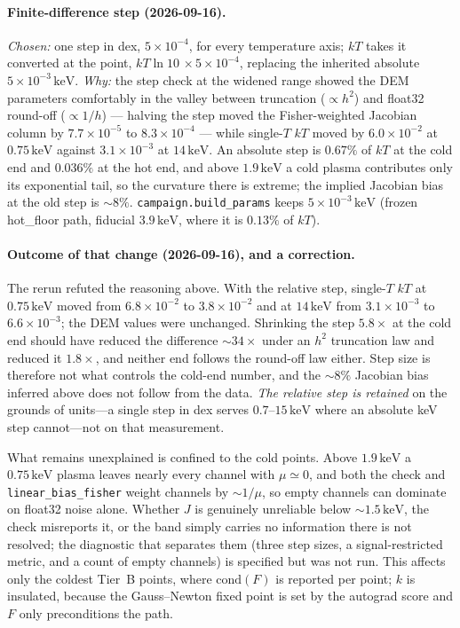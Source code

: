 \documentclass[11pt]{article}
\newcommand{\kev}{\,\mathrm{keV}}
\begin{document}
\paragraph{Finite-difference step (2026-09-16).} \emph{Chosen:} one step in
dex, $5\times10^{-4}$, for every temperature axis; $kT$ takes it converted at
the point, $kT\ln 10\,\times 5\times10^{-4}$, replacing the inherited absolute
$5\times10^{-3}\kev$. \emph{Why:} the step check at the widened range showed the
DEM parameters comfortably in the valley between truncation ($\propto h^2$) and
float32 round-off ($\propto1/h$) --- halving the step moved the Fisher-weighted
Jacobian column by $7.7\times10^{-5}$ to $8.3\times10^{-4}$ --- while single-$T$
$kT$ moved by $6.0\times10^{-2}$ at $0.75\kev$ against $3.1\times10^{-3}$ at
$14\kev$. An absolute step is $0.67\%$ of $kT$ at the cold end and $0.036\%$ at
the hot end, and above $1.9\kev$ a cold plasma contributes only its exponential
tail, so the curvature there is extreme; the implied Jacobian bias at the old
step is ${\sim}8\%$. \texttt{campaign.build\_params} keeps $5\times10^{-3}\kev$
(frozen hot\_floor path, fiducial $3.9\kev$, where it is $0.13\%$ of $kT$).

\paragraph{Outcome of that change (2026-09-16), and a correction.} The rerun
refuted the reasoning above. With the relative step, single-$T$ $kT$ at
$0.75\kev$ moved from $6.8\times10^{-2}$ to $3.8\times10^{-2}$ and at $14\kev$
from $3.1\times10^{-3}$ to $6.6\times10^{-3}$; the DEM values were unchanged.
Shrinking the step $5.8\times$ at the cold end should have reduced the
difference ${\sim}34\times$ under an $h^2$ truncation law and reduced it
$1.8\times$, and neither end follows the round-off law either. Step size is
therefore not what controls the cold-end number, and the ${\sim}8\%$ Jacobian
bias inferred above does not follow from the data. \emph{The relative step is
retained} on the grounds of units---a single step in dex serves $0.7$--$15\kev$
where an absolute keV step cannot---not on that measurement.

What remains unexplained is confined to the cold points. Above $1.9\kev$ a
$0.75\kev$ plasma leaves nearly every channel with $\mu\simeq0$, and both the
check and \texttt{linear\_bias\_fisher} weight channels by ${\sim}1/\mu$, so
empty channels can dominate on float32 noise alone. Whether $J$ is genuinely
unreliable below ${\sim}1.5\kev$, the check misreports it, or the band simply
carries no information there is not resolved; the diagnostic that separates
them (three step sizes, a signal-restricted metric, and a count of empty
channels) is specified but was not run. This affects only the coldest Tier~B
points, where $\mathrm{cond}(F)$ is reported per point; $k$ is insulated,
because the Gauss--Newton fixed point is set by the autograd score and $F$ only
preconditions the path.
\end{document}
